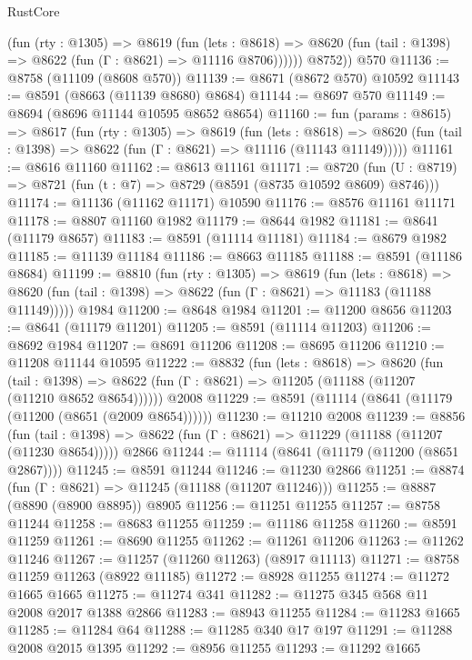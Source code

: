 \begin{lexlean}{RustCore}
\begin{coremodule}
            (fun (rty : @1305) =>
            @8619
              (fun (lets : @8618) =>
              @8620 (fun (tail : @1398) => @8622 (fun (Γ : @8621) => @11116 @8706))))))
        @8752))
    @570
@11136 := @8758 (@11109 (@8608 @570))
@11139 := @8671 (@8672 @570) @10592
@11143 := @8591 (@8663 (@11139 @8680) @8684)
@11144 := @8697 @570
@11149 := @8694 (@8696 @11144 @10595 @8652 @8654)
@11160 := fun (params : @8615) =>
  @8617
    (fun (rty : @1305) =>
    @8619
      (fun (lets : @8618) =>
      @8620 (fun (tail : @1398) => @8622 (fun (Γ : @8621) => @11116 (@11143 @11149)))))
@11161 := @8616 @11160
@11162 := @8613 @11161
@11171 := @8720
    (fun (U : @8719) => @8721 (fun (t : @7) => @8729 (@8591 (@8735 @10592 @8609) @8746)))
@11174 := @11136 (@11162 @11171) @10590
@11176 := @8576 @11161 @11171
@11178 := @8807 @11160 @1982
@11179 := @8644 @1982
@11181 := @8641 (@11179 @8657)
@11183 := @8591 (@11114 @11181)
@11184 := @8679 @1982
@11185 := @11139 @11184
@11186 := @8663 @11185
@11188 := @8591 (@11186 @8684)
@11199 := @8810
    (fun (rty : @1305) =>
    @8619
      (fun (lets : @8618) =>
      @8620 (fun (tail : @1398) => @8622 (fun (Γ : @8621) => @11183 (@11188 @11149)))))
    @1984
@11200 := @8648 @1984
@11201 := @11200 @8656
@11203 := @8641 (@11179 @11201)
@11205 := @8591 (@11114 @11203)
@11206 := @8692 @1984
@11207 := @8691 @11206
@11208 := @8695 @11206
@11210 := @11208 @11144 @10595
@11222 := @8832
    (fun (lets : @8618) =>
    @8620
      (fun (tail : @1398) =>
      @8622 (fun (Γ : @8621) => @11205 (@11188 (@11207 (@11210 @8652 @8654))))))
    @2008
@11229 := @8591 (@11114 (@8641 (@11179 (@11200 (@8651 (@2009 @8654))))))
@11230 := @11210 @2008
@11239 := @8856
    (fun (tail : @1398) => @8622 (fun (Γ : @8621) => @11229 (@11188 (@11207 (@11230 @8654)))))
    @2866
@11244 := @11114 (@8641 (@11179 (@11200 (@8651 @2867))))
@11245 := @8591 @11244
@11246 := @11230 @2866
@11251 := @8874 (fun (Γ : @8621) => @11245 (@11188 (@11207 @11246)))
@11255 := @8887 (@8890 (@8900 @8895)) @8905
@11256 := @11251 @11255
@11257 := @8758 @11244
@11258 := @8683 @11255
@11259 := @11186 @11258
@11260 := @8591 @11259
@11261 := @8690 @11255
@11262 := @11261 @11206
@11263 := @11262 @11246
@11267 := @11257 (@11260 @11263) (@8917 @11113)
@11271 := @8758 @11259 @11263 (@8922 @11185)
@11272 := @8928 @11255
@11274 := @11272 @1665 @1665
@11275 := @11274 @341
@11282 := @11275 @345 @568 @11 @2008 @2017 @1388 @2866
@11283 := @8943 @11255
@11284 := @11283 @1665
@11285 := @11284 @64
@11288 := @11285 @340 @17 @197
@11291 := @11288 @2008 @2015 @1395
@11292 := @8956 @11255
@11293 := @11292 @1665

\end{coremodule}
\end{lexlean}
